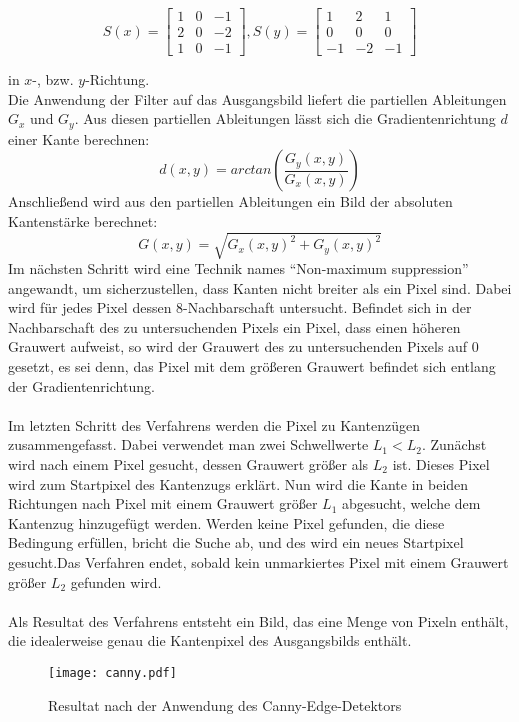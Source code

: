 \begin{equation*}
S(x) = \begin{bmatrix}
1 & 0 & -1\\ 
2 & 0 & -2\\ 
1 & 0 & -1
\end{bmatrix},
S(y) = \begin{bmatrix}
1 & 2 & 1\\ 
0 & 0 & 0\\ 
-1 &-2  &-1 
\end{bmatrix}
\end{equation*}

in $x$-, bzw. $y$-Richtung. \\
Die Anwendung der Filter auf das Ausgangsbild liefert die partiellen Ableitungen $G_x$ und $G_y$.
Aus diesen partiellen Ableitungen lässt sich die Gradientenrichtung $d$ einer Kante berechnen:
\begin{equation*}
d(x, y) = arctan(\frac{G_y(x, y)}{G_x(x, y)})
\end{equation*}
Anschließend wird aus den partiellen Ableitungen ein Bild der absoluten Kantenstärke berechnet:
\begin{equation*}
G(x, y) = \sqrt{G_x(x, y)^2 + G_y(x, y)^2}
\end{equation*}
Im nächsten Schritt wird eine Technik names “Non-maximum suppression” angewandt, um sicherzustellen, dass Kanten nicht breiter als ein Pixel sind. Dabei wird für jedes Pixel dessen 8-Nachbarschaft untersucht. Befindet sich in der Nachbarschaft des zu untersuchenden Pixels ein Pixel, dass einen höheren Grauwert aufweist, so wird der Grauwert des zu untersuchenden Pixels auf 0 gesetzt, es sei denn, das Pixel mit dem größeren Grauwert befindet sich entlang der Gradientenrichtung. \\ \\
Im letzten Schritt des Verfahrens werden die Pixel zu Kantenzügen zusammengefasst.
Dabei verwendet man zwei Schwellwerte $L_1 < L_2$. Zunächst wird nach einem Pixel gesucht, dessen Grauwert größer als $L_2$ ist. Dieses Pixel wird zum Startpixel des Kantenzugs erklärt. Nun wird die Kante in beiden Richtungen nach Pixel mit einem Grauwert größer $L_1$ abgesucht, welche dem Kantenzug hinzugefügt werden. Werden keine Pixel gefunden, die diese Bedingung erfüllen, bricht die Suche ab, und des wird ein neues Startpixel gesucht.Das Verfahren endet, sobald kein unmarkiertes Pixel mit einem Grauwert größer $L_2$ gefunden wird. \\ \\
Als Resultat des Verfahrens entsteht ein Bild, das eine Menge von Pixeln enthält, die idealerweise genau die Kantenpixel des Ausgangsbilds enthält.
\begin{figure}[H]
  \begin{center}
    \texttt{[image: canny.pdf]}
    \caption{Resultat nach der Anwendung des Canny-Edge-Detektors}
    \label{fig:canny}
  \end{center}
\end{figure}

